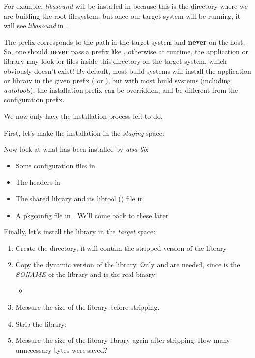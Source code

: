 For example, {\em libasound} will be installed in
 because this is
the directory where we are building the root filesystem, but once our
target system will be running, it will see {\em libasound} in
.

The prefix corresponds to the path in the target system and {\bf
  never} on the host. So, one should {\bf never} pass a prefix like
, otherwise at
runtime, the application or library may look for files inside this
directory on the target system, which obviously doesn't exist! By
default, most build systems will install the application or library in
the given prefix ( or ), but with most
build systems (including {\em autotools}), the installation prefix can
be overridden, and be different from the configuration prefix.

We now only have the installation process left to do.

First, let's make the installation in the {\em staging} space:

Now look at what has been installed by {\em alsa-lib}:
\begin{itemize}
\item Some configuration files in 
\item The headers in 
\item The shared library and its libtool () file in 
\item A pkgconfig file in . We'll come back
  to these later
\end{itemize}

Finally, let's install the library in the {\em target} space:

\begin{enumerate}
\item Create the  directory, it will contain the
  stripped version of the library
\item Copy the dynamic version of the library. Only
   and  are needed,
  since  is the {\em SONAME} of the library and
   is the real binary:
  \begin{itemize}
  \item {}
  \end{itemize}
\item Measure the size of the 
  library before stripping.
\item Strip the library:
\begin{bashinput}
$ %
  \end{bashinput}
\item Measure the size of the 
  library library again after stripping. How many unnecessary bytes
  were saved?
\end{enumerate}

